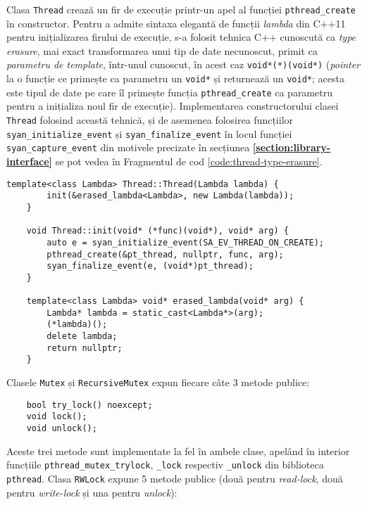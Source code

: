 Clasa \lstinline{Thread} crează un fir de execuție printr-un apel al
funcției \lstinline{pthread_create} în constructor. Pentru a admite
sintaxa elegantă de funcții \textit{lambda} din C++11 pentru
inițializarea firului de execuție, s-a folosit tehnica C++ cunoscută ca
\textit{type erasure}\cite{TypeErasure}, mai exact transformarea unui
tip de date necunoscut, primit ca \textit{parametru de template},
într-unul cunoscut, în acest caz \lstinline{void*(*)(void*)}
(\textit{pointer} la o funcție ce primește ca parametru un
\lstinline{void*} și returnează un \lstinline{void*}; acesta este tipul
de date pe care îl primește funcția \lstinline{pthread_create} ca
parametru pentru a inițializa noul fir de execuție). Implementarea
constructorului clasei \lstinline{Thread} folosind această tehnică,
și de asemenea folosirea funcțiilor \lstinline{syan_initialize_event} și
\lstinline{syan_finalize_event} în locul funcției
\lstinline{syan_capture_event} din motivele precizate în secțiunea
\textbf{\ref{section:library-interface}} se pot vedea în Fragmentul de
cod \ref{code:thread-type-erasure}.
\begin{lstlisting}[caption=Tehnica \textit{type-erasure} în
                           clasa \lstinline{Thread} din
                           \lstinline{cxxsync},
                   label=code:thread-type-erasure]
    template<class Lambda> Thread::Thread(Lambda lambda) {
        init(&erased_lambda<Lambda>, new Lambda(lambda));
    }

    void Thread::init(void* (*func)(void*), void* arg) {
        auto e = syan_initialize_event(SA_EV_THREAD_ON_CREATE);
        pthread_create(&pt_thread, nullptr, func, arg);
        syan_finalize_event(e, (void*)pt_thread);
    }

    template<class Lambda> void* erased_lambda(void* arg) {
        Lambda* lambda = static_cast<Lambda*>(arg);
        (*lambda)();
        delete lambda;
        return nullptr;
    }
\end{lstlisting}

Clasele \lstinline{Mutex} și \lstinline{RecursiveMutex} expun fiecare
câte 3 metode publice:
\begin{lstlisting}
    bool try_lock() noexcept;
    void lock();
    void unlock();
\end{lstlisting}

Aceste trei metode sunt implementate la fel în ambele clase, apelând în
interior funcțiile \lstinline{pthread_mutex_trylock},
\lstinline{_lock} respectiv \lstinline{_unlock} din biblioteca
\lstinline{pthread}. Clasa \lstinline{RWLock} expune 5 metode publice
(două pentru \textit{read-lock}, două pentru \textit{write-lock} și una
pentru \textit{unlock}):

